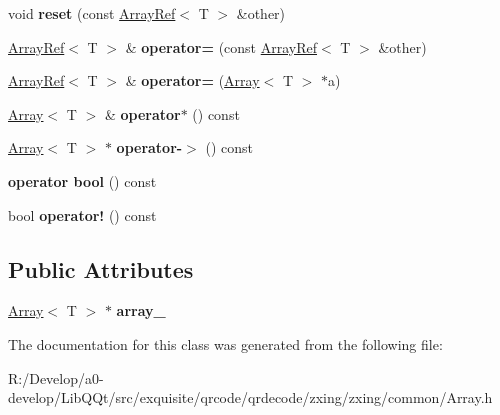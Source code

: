 \begin{DoxyCompactItemize}
void {\bfseries reset} (const \mbox{\hyperlink{classzxing_1_1_array_ref}{Array\+Ref}}$<$ T $>$ \&other)
\item 
\mbox{\label{classzxing_1_1_array_ref_a96a4a377ceabe77d31d72973f2fa70ec}} 
\mbox{\hyperlink{classzxing_1_1_array_ref}{Array\+Ref}}$<$ T $>$ \& {\bfseries operator=} (const \mbox{\hyperlink{classzxing_1_1_array_ref}{Array\+Ref}}$<$ T $>$ \&other)
\item 
\mbox{\label{classzxing_1_1_array_ref_ab5ffe556684bb13eae4dcf9e8ab2d01b}} 
\mbox{\hyperlink{classzxing_1_1_array_ref}{Array\+Ref}}$<$ T $>$ \& {\bfseries operator=} (\mbox{\hyperlink{classzxing_1_1_array}{Array}}$<$ T $>$ $\ast$a)
\item 
\mbox{\label{classzxing_1_1_array_ref_a0c0b4a35dbfb6ecc72b95afbb124810a}} 
\mbox{\hyperlink{classzxing_1_1_array}{Array}}$<$ T $>$ \& {\bfseries operator$\ast$} () const
\item 
\mbox{\label{classzxing_1_1_array_ref_a83bbea1ccf7851acf5928bae639c73ec}} 
\mbox{\hyperlink{classzxing_1_1_array}{Array}}$<$ T $>$ $\ast$ {\bfseries operator-\/$>$} () const
\item 
\mbox{\label{classzxing_1_1_array_ref_ab639db9cba6d1a8f3f1d1603f96f9114}} 
{\bfseries operator bool} () const
\item 
\mbox{\label{classzxing_1_1_array_ref_a71474c37c98a9ea370f219312e90d292}} 
bool {\bfseries operator!} () const
\end{DoxyCompactItemize}
\subsection*{Public Attributes}
\begin{DoxyCompactItemize}
\item 
\mbox{\label{classzxing_1_1_array_ref_af30d6893455d96e14fa81e8fa9220fdc}} 
\mbox{\hyperlink{classzxing_1_1_array}{Array}}$<$ T $>$ $\ast$ {\bfseries array\+\_\+}
\end{DoxyCompactItemize}


The documentation for this class was generated from the following file\+:\begin{DoxyCompactItemize}
\item 
R\+:/\+Develop/a0-\/develop/\+Lib\+Q\+Qt/src/exquisite/qrcode/qrdecode/zxing/zxing/common/Array.\+h\end{DoxyCompactItemize}
